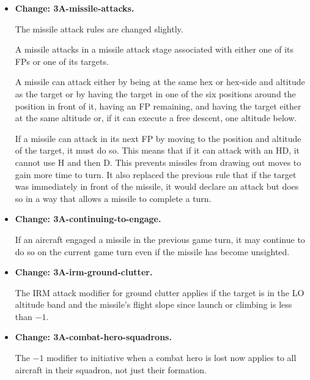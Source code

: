 \documentclass[10pt]{report}
\newcommand{\itemtag}[1]{\item \textbf{Change: #1.}\par}
\begin{document}
\begin{itemize}
    \itemtag{3A-missile-attacks} The missile attack rules are changed slightly. 
    
    A missile attacks in a missile attack stage associated with either one of its FPs or one of its targets. 
    
    A missile can attack either by being at the same hex or hex-side and altitude as the target or by having the target in one of the six positions around the position in front of it, having an FP remaining, and having the target either at the same altitude or, if it can execute a free descent, one altitude below.

    If a missile can attack in its next FP by moving to the position and altitude of the target, it must do so. This means that if it can attack with an HD, it cannot use H and then D. This prevents missiles from drawing out moves to gain more time to turn. It also replaced the previous rule that if the target was immediately in front of the missile, it would declare an attack but does so in a way that allows a missile to complete a turn.

    \itemtag{3A-continuing-to-engage} If an aircraft engaged a missile in the previous game turn, it may continue to do so on the current game turn even if the missile has become unsighted.
    
    \itemtag{3A-irm-ground-clutter} The IRM attack modifier for ground clutter applies if the target is in the LO altitude band and the missile's flight slope since launch or climbing is less than $-1$.
    
    \itemtag{3A-combat-hero-squadrons} The $-1$ modifier to initiative when a combat hero is lost now applies to all aircraft in their squadron, not just their formation.


       
    
    

    
    
    

\end{itemize}
\end{document}
